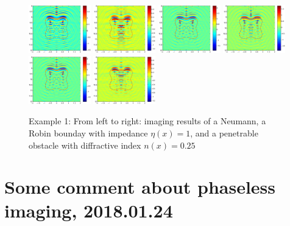 \documentclass[12pt]{iopart}
\begin{document}
\begin{figure}
	\includegraphics[width=0.24\textwidth]{./graphic/p_leaf_3pi_impedance_1.eps}
	\includegraphics[width=0.24\textwidth]{./graphic/p_leaf_3pi_transmission.eps}
	\includegraphics[width=0.24\textwidth]{./graphic/p_leaf_4pi.eps}
	\includegraphics[width=0.24\textwidth]{./graphic/p_leaf_4pi_neumann.eps}
	\includegraphics[width=0.24\textwidth]{./graphic/p_leaf_4pi_impedance_1.eps}
	\includegraphics[width=0.24\textwidth]{./graphic/p_leaf_4pi_transmission.eps}
	
	
	\caption{Example 1: From left to right: imaging results of a Neumann, a Robin bounday with impedance $\eta(x)=1$, and a penetrable obstacle with diffractive index $n(x)=0.25$}\label{figure_rtm_half}
\end{figure}
 
\section{Some comment about phaseless imaging, 2018.01.24}
\end{document}
